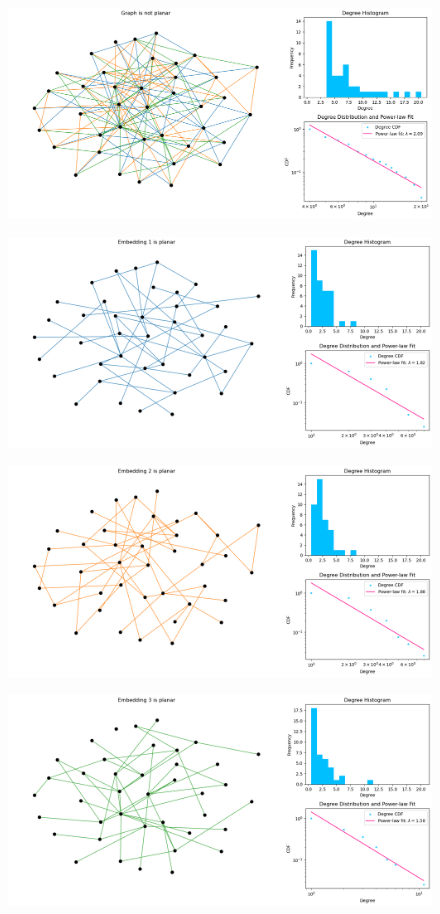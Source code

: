 \documentclass{article}
\begin{document}
\begin{figure}[h]
    \centering
    \includegraphics[width=12cm]{../images/graph.png}
\end{figure}
\begin{figure}[h]
    \centering
    \includegraphics[width=12cm]{../images/graph-embedding1.png}
\end{figure}
\begin{figure}[h]
    \centering
    \includegraphics[width=12cm]{../images/graph-embedding2.png}
\end{figure}
\begin{figure}[h]
    \centering
    \includegraphics[width=12cm]{../images/graph-embedding3.png}
\end{figure}
\end{document}
